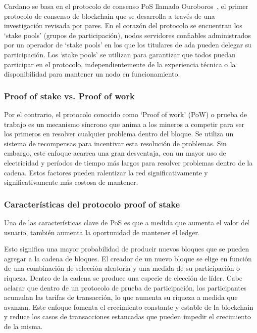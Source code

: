 \documentclass[12pt]{book}
\begin{document}
Cardano se basa en el protocolo de consenso PoS llamado Ouroboros~\cite{pof_ouroboros}, el primer protocolo de consenso de blockchain que se desarrolla a través de una investigación revisada por pares. En el corazón del protocolo se encuentran los `stake pools' (grupos de participación), nodos servidores confiables administrados por un operador de `stake pools' en los que los titulares de ada pueden delegar su participación. Los `stake pools' se utilizan para garantizar que todos puedan participar en el protocolo, independientemente de la experiencia técnica o la disponibilidad para mantener un nodo en funcionamiento.

\subsubsection{Proof of stake vs. Proof of work}

Por el contrario, el protocolo conocido como `Proof of work' (PoW) o prueba de trabajo es un mecanismo síncrono que anima a los mineros a competir para ser los primeros en resolver cualquier problema dentro del bloque. Se utiliza un sistema de recompensas para incentivar esta resolución de problemas. Sin embargo, este enfoque acarrea una gran desventaja, con un mayor uso de electricidad y períodos de tiempo más largos para resolver problemas dentro de la cadena. Estos factores pueden ralentizar la red significativamente y significativamente más costosa de mantener.

\subsubsection{Características del protocolo proof of stake}

Una de las características clave de PoS es que a medida que aumenta el valor del usuario, también aumenta la oportunidad de mantener el ledger.

Esto significa una mayor probabilidad de producir nuevos bloques que se pueden agregar a la cadena de bloques. El creador de un nuevo bloque se elige en función de una combinación de selección aleatoria y una medida de su participación o riqueza. Dentro de la cadena se produce una especie de elección de líder. Cabe aclarar que dentro de un protocolo de prueba de participación, los participantes acumulan las tarifas de transacción, lo que aumenta su riqueza a medida que avanzan. Este enfoque fomenta el crecimiento constante y estable de la blockchain y reduce los casos de transacciones estancadas que pueden impedir el crecimiento de la misma.
\end{document}

